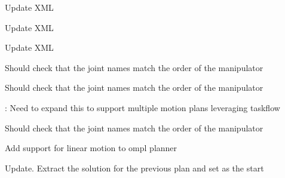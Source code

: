 \begin{DoxyRefList}
\label{todo__todo000004}%
%
Update X\+ML 

\label{todo__todo000005}%
%
Update X\+ML  
\item[Member \mbox{\hyperlink{classtesseract__planning_1_1DescartesDefaultPlanProfile_ab0ef1a785193fd3a1b91dba16e547462}{tesseract\+\_\+planning\+::Descartes\+Default\+Plan\+Profile$<$ Float\+Type $>$\+::to\+X\+ML}} (tinyxml2\+::\+X\+M\+L\+Document \&doc) const override]\label{todo__todo000006}%
%
Update X\+ML  
\item[Member \mbox{\hyperlink{namespacetesseract__planning_a5479a76ec33cda8924d0e54d336e5ccc}{tesseract\+\_\+planning\+::Default\+Descartes\+Problem\+Generator}} (const std\+::string \&name, const \mbox{\hyperlink{structtesseract__planning_1_1PlannerRequest}{Planner\+Request}} \&request, const Descartes\+Plan\+Profile\+Map$<$ Float\+Type $>$ \&plan\+\_\+profiles)]\label{todo__todo000007}%
%
Should check that the joint names match the order of the manipulator 

\label{todo__todo000008}%
%
Should check that the joint names match the order of the manipulator  
\item[Member \mbox{\hyperlink{classtesseract__planning_1_1OMPLMotionPlanner_a5e97b6b8cfb1f6e22ddac32cc6d4cbad}{tesseract\+\_\+planning\+::O\+M\+P\+L\+Motion\+Planner\+::solve}} (const \mbox{\hyperlink{structtesseract__planning_1_1PlannerRequest}{Planner\+Request}} \&request, \mbox{\hyperlink{structtesseract__planning_1_1PlannerResponse}{Planner\+Response}} \&response, bool verbose=false) const override]\label{todo__todo000011}%
%
\+: Need to expand this to support multiple motion plans leveraging taskflow  
\item[Member \mbox{\hyperlink{namespacetesseract__planning_aea01fa1e8905fe55ee93a63c16b72519}{tesseract\+\_\+planning\+::Default\+O\+M\+P\+L\+Problem\+Generator}} (const std\+::string \&name, const \mbox{\hyperlink{structtesseract__planning_1_1PlannerRequest}{Planner\+Request}} \&request, const O\+M\+P\+L\+Plan\+Profile\+Map \&plan\+\_\+profiles)]\label{todo__todo000012}%
%
Should check that the joint names match the order of the manipulator 

\label{todo__todo000013}%
%
Add support for linear motion to ompl planner 

\label{todo__todo000014}%
%
Update. Extract the solution for the previous plan and set as the start 


\end{DoxyRefList}
